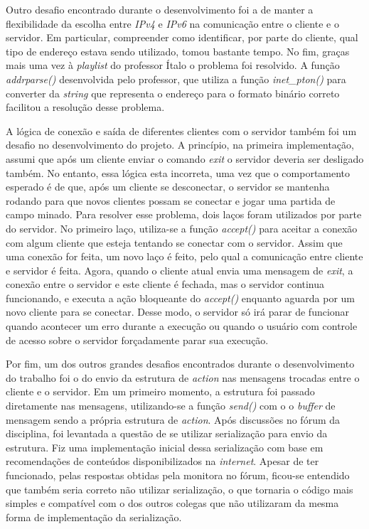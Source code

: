 \documentclass{article}
\begin{document}
Outro desafio encontrado durante o desenvolvimento foi a de manter a
flexibilidade da escolha entre \textit{IPv4} e \textit{IPv6} na comunicação
entre o cliente e o servidor. Em particular, compreender como identificar, por
parte do cliente, qual tipo de endereço estava sendo utilizado, tomou bastante
tempo. No fim,
graças mais uma vez à \textit{playlist} do professor Ítalo o problema foi
resolvido. A função \textit{addrparse()} desenvolvida pelo professor, que
utiliza a função \textit{inet\_pton()} para converter da \textit{string} que
representa o endereço para o formato binário correto
facilitou a resolução desse problema.

A lógica de conexão e saída de diferentes clientes com o servidor também foi um
desafio no desenvolvimento do projeto. A princípio,
na primeira implementação, assumi que após um cliente enviar o comando
\textit{exit} o servidor deveria ser desligado também. No entanto, essa lógica
esta
incorreta, uma vez que o comportamento esperado é de que, após um cliente se
desconectar, o servidor se mantenha rodando para que novos clientes possam se
conectar e jogar uma partida de
campo minado. Para resolver esse problema, dois laços foram utilizados por
parte do servidor. No primeiro laço, utiliza-se a função \textit{accept()} para
aceitar a conexão com
algum cliente que esteja tentando se conectar com o servidor. Assim que uma
conexão for feita, um novo laço é feito, pelo qual a comunicação entre cliente
e servidor é feita. Agora, quando
o cliente atual envia uma mensagem de \textit{exit}, a conexão entre o servidor
e este cliente é fechada, mas o servidor continua funcionando, e executa a ação
bloqueante do \textit{accept()} enquanto aguarda por um novo cliente para
se conectar. Desse modo, o servidor só irá parar de funcionar quando acontecer
um erro durante a execução ou quando o usuário com controle de acesso sobre o
servidor forçadamente parar sua execução.

Por fim, um dos outros grandes desafios encontrados durante o desenvolvimento
do trabalho foi o do envio da estrutura de \textit{action} nas mensagens
trocadas entre
o cliente e o servidor. Em um primeiro momento, a estrutura foi passado
diretamente nas mensagens, utilizando-se a função \textit{send()} com o o
\textit{buffer} de mensagem
sendo a própria estrutura de \textit{action}. Após discussões no fórum da
disciplina, foi levantada a questão de se utilizar
serialização para envio da estrutura. Fiz uma implementação inicial dessa
serialização com base em recomendações de conteúdos
disponibilizados na \textit{internet}. Apesar de ter funcionado, pelas
respostas obtidas pela monitora no fórum, ficou-se entendido que
também seria correto não utilizar serialização, o que tornaria o código mais
simples e compatível com o dos outros colegas que não utilizaram
da mesma forma de implementação da serialização.
\end{document}
